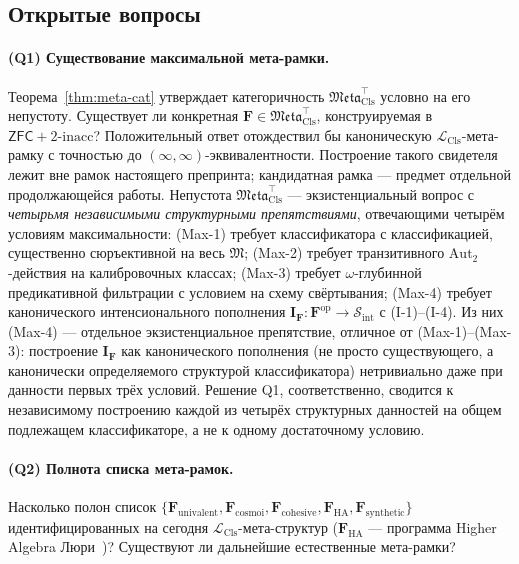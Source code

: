 \documentclass[11pt]{article}
\theoremstyle{plain}
\theoremstyle{definition}
\newcommand{\cS}{\mathcal{S}}
\newcommand{\fM}{\mathfrak{M}}
\newcommand{\Meta}{\mathfrak{Meta}}
\newcommand{\LCls}{\mathcal{L}_{\mathrm{Cls}}}
\newcommand{\Sint}{\cS_{\mathrm{int}}}
\newcommand{\ZFC}{\mathsf{ZFC}}
\newcommand{\II}{\mathbf{I}}
\begin{document}
\subsection{Открытые вопросы}

\paragraph{(Q1) Существование максимальной мета-рамки.} Теорема~\ref{thm:meta-cat} утверждает категоричность $\Meta_{\mathrm{Cls}}^{\top}$ условно на его непустоту. Существует ли конкретная $\mathbf{F} \in \Meta_{\mathrm{Cls}}^{\top}$, конструируемая в $\ZFC + 2\text{-inacc}$? Положительный ответ отождествил бы каноническую $\LCls$-мета-рамку с точностью до $(\infty, \infty)$-эквивалентности. Построение такого свидетеля лежит вне рамок настоящего препринта; кандидатная рамка — предмет отдельной продолжающейся работы. Непустота $\Meta_{\mathrm{Cls}}^{\top}$ — экзистенциальный вопрос с \emph{четырьмя независимыми структурными препятствиями}, отвечающими четырём условиям максимальности: (Max-1) требует классификатора с классификацией, существенно сюръективной на весь $\fM$; (Max-2) требует транзитивного $\mathrm{Aut}_2$-действия на калибровочных классах; (Max-3) требует $\omega$-глубинной предикативной фильтрации с условием на схему свёртывания; (Max-4) требует канонического интенсионального пополнения $\II_{\mathbf{F}} : \mathbf{F}^{\mathrm{op}} \to \Sint$ с (I-1)--(I-4). Из них (Max-4) — отдельное экзистенциальное препятствие, отличное от (Max-1)--(Max-3): построение $\II_\mathbf{F}$ как канонического пополнения (не просто существующего, а канонически определяемого структурой классификатора) нетривиально даже при данности первых трёх условий. Решение Q1, соответственно, сводится к независимому построению каждой из четырёх структурных данностей на общем подлежащем классификаторе, а не к одному достаточному условию.

\paragraph{(Q2) Полнота списка мета-рамок.} Насколько полон список $\{\mathbf{F}_{\mathrm{univalent}},\allowbreak \mathbf{F}_{\mathrm{cosmoi}},\allowbreak \mathbf{F}_{\mathrm{cohesive}},\allowbreak \mathbf{F}_{\mathrm{HA}},\allowbreak \mathbf{F}_{\mathrm{synthetic}}\}$ идентифицированных на сегодня $\LCls$-мета-структур ($\mathbf{F}_{\mathrm{HA}}$ — программа Higher Algebra Люри~\cite{LurieHA})? Существуют ли дальнейшие естественные мета-рамки?
\end{document}
